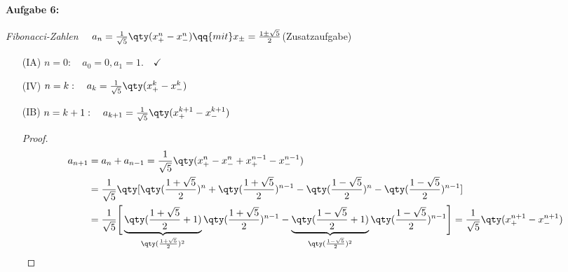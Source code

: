 \paragraph{Aufgabe 6: } \emph{Fibonacci-Zahlen} $\quad a_n=\frac{1}{\sqrt{5}}\qty(x_+^n-x_-^n) \qq{mit}x_\pm = \frac{1\pm \sqrt{5}}{2}$\hfill (Zusatzaufgabe)

\begin{enumerate}
    \setlength{\mathindent}{0cm}
    \item[(IA)] $n=0: \quad a_0 = 0, a_1 = 1. \quad\checkmark$ 
    \item[(IV)] $n=k: \quad a_k = \frac{1}{\sqrt{5}}\qty(x_+^k-x_-^k)$
    \item[(IB)] $n=k+1: \quad a_{k+1} = \frac{1}{\sqrt{5}}\qty(x_+^{k+1}-x_-^{k+1})$
    \begin{proof}
        \begin{align}
            a_{n+1}&=a_n+a_{n-1}=\frac{1}{\sqrt{5}}\qty(x_+^n-x_-^n+x_+^{n-1}-x_-^{n-1})\\
            &=\frac{1}{\sqrt{5}}\qty[\qty(\frac{1+\sqrt{5}}{2})^n+\qty(\frac{1+\sqrt{5}}{2})^{n-1}-\qty(\frac{1-\sqrt{5}}{2})^n-\qty(\frac{1-\sqrt{5}}{2})^{n-1}]\\
            &=\frac{1}{\sqrt{5}}\Bigg[\underbrace{\qty(\frac{1+\sqrt{5}}{2}+1)}_{\qty(\frac{1+\sqrt{5}}{2})^2}\qty(\frac{1+\sqrt{5}}{2})^{n-1}-\underbrace{\qty(\frac{1-\sqrt{5}}{2}+1)}_{\qty(\frac{1-\sqrt{5}}{2})^2}\qty(\frac{1-\sqrt{5}}{2})^{n-1}\Bigg]
            =\frac{1}{\sqrt{5}}\qty(x_+^{n+1}-x_-^{n+1})
        \end{align}
    \end{proof}
\end{enumerate}
